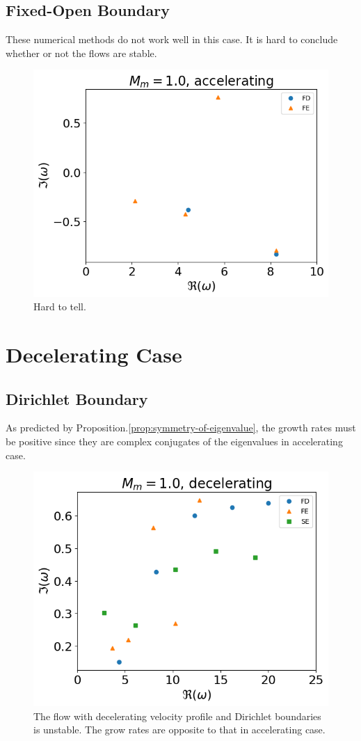 \subsection{Fixed-Open Boundary}
These numerical methods do not work well in this case. It is hard to conclude whether or not the flows are stable.
\begin{figure} [H]
	\centering
	\includegraphics[width=0.7\linewidth]{img/numerical-experiments/fixed-open/accelerating-v}
	\caption{Hard to tell.}
	\label{fig:accelerating-v-fixed_open}
\end{figure}


\section{Decelerating Case}
\subsection{Dirichlet Boundary}
As predicted by Proposition.\ref{prop:symmetry-of-eigenvalue}, the growth rates must be positive since they are complex conjugates of the eigenvalues in accelerating case.

\begin{figure} [H]
	\centering
	\includegraphics[width=0.7\linewidth]{img/numerical-experiments/fixed-fixed/decelerating-v}
	\caption{The flow with decelerating velocity profile and Dirichlet boundaries is unstable. The grow rates are opposite to that in accelerating case.}
	\label{fig:decelerating-v-dirichlet}
\end{figure}

